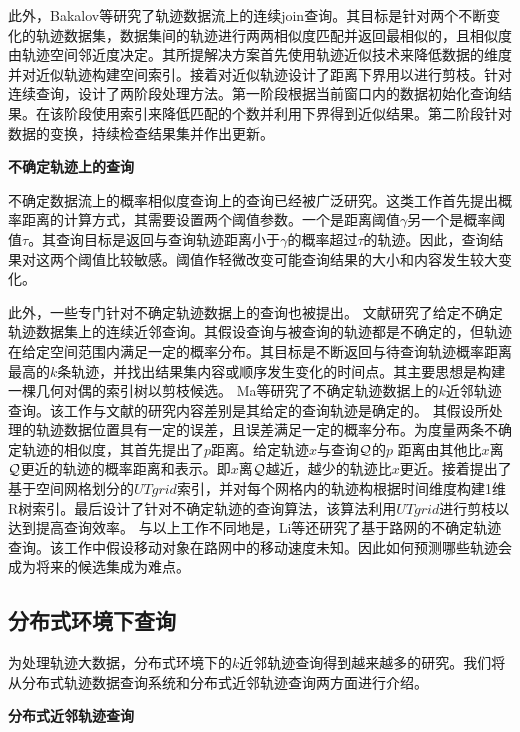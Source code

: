 此外，Bakalov等研究了轨迹数据流上的连续join查询\cite{BakalovT06}。其目标是针对两个不断变化的轨迹数据集，数据集间的轨迹进行两两相似度匹配并返回最相似的，且相似度由轨迹空间邻近度决定。其所提解决方案首先使用轨迹近似技术来降低数据的维度并对近似轨迹构建空间索引。接着对近似轨迹设计了距离下界用以进行剪枝。针对连续查询，设计了两阶段处理方法。第一阶段根据当前窗口内的数据初始化查询结果。在该阶段使用索引来降低匹配的个数并利用下界得到近似结果。第二阶段针对数据的变换，持续检查结果集并作出更新。

\textbf{不确定轨迹上的查询}

不确定数据流上的概率相似度查询上的查询已经被广泛研究\cite{LianCY08,YehWYC09}。这类工作首先提出概率距离的计算方式，其需要设置两个阈值参数。一个是距离阈值$\gamma$另一个是概率阈值$\tau$。其查询目标是返回与查询轨迹距离小于$\gamma$的概率超过$\tau$的轨迹。因此，查询结果对这两个阈值比较敏感。阈值作轻微改变可能查询结果的大小和内容发生较大变化。

此外，一些专门针对不确定轨迹数据上的查询也被提出\cite{TrajcevskiTDSC09,Trajcevski2011,Ma2013KSQ}。
文献\cite{TrajcevskiTDSC09,Trajcevski2011}研究了给定不确定轨迹数据集上的连续近邻查询。其假设查询与被查询的轨迹都是不确定的，但轨迹在给定空间范围内满足一定的概率分布。其目标是不断返回与待查询轨迹概率距离最高的$k$条轨迹，并找出结果集内容或顺序发生变化的时间点。其主要思想是构建一棵几何对偶的索引树以剪枝候选。
Ma等研究了不确定轨迹数据上的$k$近邻轨迹查询\cite{Ma2013KSQ}。该工作与文献\cite{TrajcevskiTDSC09}的研究内容差别是其给定的查询轨迹是确定的。
其假设所处理的轨迹数据位置具有一定的误差，且误差满足一定的概率分布。为度量两条不确定轨迹的相似度，其首先提出了$p$距离。给定轨迹$x$与查询$\cal Q$的$p$ 距离由其他比$x$离$\cal Q$更近的轨迹的概率距离和表示。即$x$离$\cal Q$越近，越少的轨迹比$x$更近。接着提出了基于空间网格划分的$UTgrid$索引，并对每个网格内的轨迹构根据时间维度构建1维R树索引。最后设计了针对不确定轨迹的查询算法，该算法利用$UTgrid$进行剪枝以达到提高查询效率。
与以上工作不同地是，Li等还研究了基于路网的不确定轨迹查询\cite{LiLSF11}。该工作中假设移动对象在路网中的移动速度未知。因此如何预测哪些轨迹会成为将来的候选集成为难点。

\subsection{分布式环境下查询}
为处理轨迹大数据，分布式环境下的$k$近邻轨迹查询得到越来越多的研究。我们将从分布式轨迹数据查询系统和分布式近邻轨迹查询两方面进行介绍。


\textbf{分布式近邻轨迹查询}

